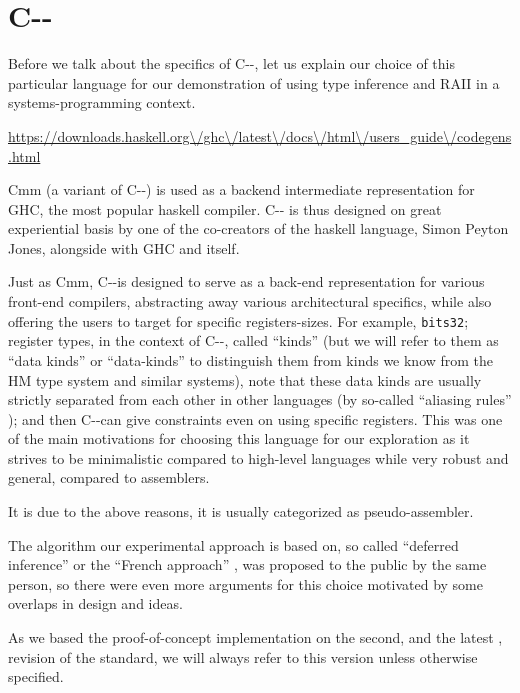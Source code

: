 
\providecommand{\cmm}{C-{}-}

\chapter{C-{}-}


Before we talk about the specifics of C-{}-, let us explain our choice of this particular language for our demonstration of using type inference and RAII in a systems-programming context.

\url{https://downloads.haskell.org\/ghc\/latest\/docs\/html\/users_guide\/codegens.html}


Cmm (a variant of C-{}-) is used as a backend intermediate representation for GHC, the most popular haskell compiler. C-{}- is thus designed on great experiential basis by one of the co-creators of the haskell language, Simon Peyton Jones, alongside with GHC and itself.

Just as Cmm, \cmm is designed to serve as a back-end representation for various front-end compilers, abstracting away various architectural specifics, while also offering the users to target for specific registers-sizes. For example, \lstinline{bits32}; register types, in the context of \cmm, called ``kinds'' (but we will refer to them as ``data kinds'' or ``data-kinds'' to distinguish them from kinds we know from the HM type system and similar systems), note that these data kinds are usually strictly separated from each other in other languages (by so-called ``aliasing rules'' ); and then \cmm can give constraints even on using specific registers. This was one of the main motivations for choosing this language for our exploration as it strives to be minimalistic compared to high-level languages while very robust and general, compared to assemblers.

It is due to the above reasons, it is usually categorized as pseudo-assembler.

The algorithm our experimental approach is based on, so called ``deferred inference'' or the ``French approach'' , was proposed to the public by the same person, so there were even more arguments for this choice motivated by some overlaps in design and ideas. 

As we based the proof-of-concept implementation on the second, and the latest , revision of the standard, we will always refer to this version unless otherwise specified.

